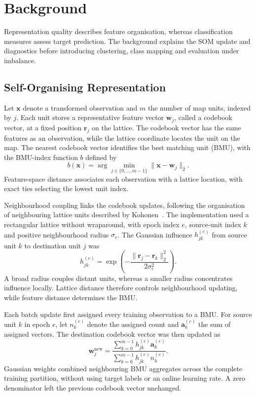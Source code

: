 \section{Background}

Representation quality describes feature organisation, whereas classification measures assess target prediction. The background explains the SOM update and diagnostics before introducing clustering, class mapping and evaluation under imbalance.

\subsection{Self-Organising Representation}

Let $\mathbf{x}$ denote a transformed observation and $m$ the number of map units, indexed by $j$. Each unit stores a representative feature vector $\mathbf{w}_j$, called a codebook vector, at a fixed position $\mathbf{r}_j$ on the lattice. The codebook vector has the same features as an observation, while the lattice coordinate locates the unit on the map. The nearest codebook vector identifies the best matching unit (BMU), with the BMU-index function $b$ defined by
\begin{equation}
 b(\mathbf{x})=\arg\min_{j\in\{0,\ldots,m-1\}}
       \|\mathbf{x}-\mathbf{w}_j\|_2.
 \label{eq:bmu}
\end{equation}
Feature-space distance associates each observation with a lattice location, with exact ties selecting the lowest unit index.

Neighbourhood coupling links the codebook updates, following the organisation of neighbouring lattice units described by Kohonen~\cite{kohonen2013}. The implementation used a rectangular lattice without wraparound, with epoch index $e$, source-unit index $k$ and positive neighbourhood radius $\sigma_e$. The Gaussian influence $h_{jk}^{(e)}$ from source unit $k$ to destination unit $j$ was
\begin{equation}
 h_{jk}^{(e)}=\exp\left(-\frac{\|\mathbf{r}_j-\mathbf{r}_k\|_2^2}
                                      {2\sigma_e^2}\right).
 \label{eq:gaussian}
\end{equation}
A broad radius couples distant units, whereas a smaller radius concentrates influence locally. Lattice distance therefore controls neighbourhood updating, while feature distance determines the BMU.

Each batch update first assigned every training observation to a BMU. For source unit $k$ in epoch $e$, let $n_k^{(e)}$ denote the assigned count and $\mathbf{a}_k^{(e)}$ the sum of assigned vectors. The destination codebook vector was then updated as
\begin{equation}
 \mathbf{w}_j^{\mathrm{new}}=
 \frac{\sum_{k=0}^{m-1}h_{jk}^{(e)}\mathbf{a}_k^{(e)}}
      {\sum_{k=0}^{m-1}h_{jk}^{(e)}n_k^{(e)}}.
 \label{eq:batch}
\end{equation}
Gaussian weights combined neighbouring BMU aggregates across the complete training partition, without using target labels or an online learning rate. A zero denominator left the previous codebook vector unchanged.

